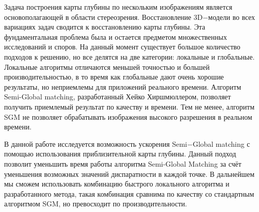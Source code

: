\startprefacepage

Задача построения карты глубины по нескольким изображениям является основополагающей в области стереозрения. Восстановление 3D$-$модели во всех вариациях задач сводится к восстановлению карты глубины. Эта фундаментальная проблема была и остается предметом множественных исследований и споров. На данный момент существует большое количество подходов к решению, но все делятся на две категории: локальные и глобальные. Локальные алгоритмы отличаются меньшей точностью и большей производительностью, в то время как глобальные дают очень хорошие результаты, но неприемлемы для приложений реального времени. Алгоритм Semi-Global matching, разработанный Хейко Хиршмюллером, позволяет получить приемлемый результат по качеству и времени. Тем не менее, алгоритм SGM не позволяет обрабатывать изображения высокого разрешения в реальном времени.

В данной работе исследуется возможность ускорения Semi$-$Global matching с помощью использования приблизительной карты глубины. Данный подход позволит уменьшить время работы алгоритма Semi-Global Matching за счёт уменьшения возможных значений диспаратности в каждой точке. В дальнейшем мы сможем использовать комбинацию быстрого локального алгоритма и разработанного метода, такая комбинация сравнима по качеству со стандартным алгоритмом SGM, но превосходит по производительности.